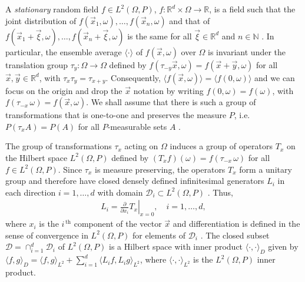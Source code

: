 \documentclass{cmslatex}
\begin{document}
A \emph{stationary} random field $f\in L^2(\Omega,P)$, 
$f:\mathbb{R}^d\times\Omega\to\mathbb{R}$, is a field such that the 
joint distribution of $f(\vec{x}_1,\omega),\ldots,f(\vec{x}_n,\omega)$ and that of
$f(\vec{x}_1+\vec{\xi},\omega),\ldots,f(\vec{x}_n+\vec{\xi},\omega)$ is the same for all
$\vec{\xi}\in\mathbb{R}^d$ and $n\in\mathbb{N}$
\cite{Golden:CMP-473,Papanicolaou:RF-835}. In particular, the ensemble
average $\langle\cdot\rangle$ of $f(\vec{x},\omega)$ over $\Omega$ is 
invariant under the translation group $\tau_y:\Omega\to\Omega$ defined by
$f(\tau_{-y}\vec{x},\omega)=f(\vec{x}+\vec{y},\omega)$ for all
$\vec{x},\vec{y}\in\mathbb{R}^d$, with $\tau_x\tau_y=\tau_{x+y}$. Consequently, 
$\langle f(\vec{x},\omega)\rangle=\langle f(0,\omega)\rangle$ and we can focus on the origin and drop the
$\vec{x}$ notation by writing $f(0,\omega)=f(\omega)$, with
$f(\tau_{-x}\,\omega)=f(\vec{x},\omega)$. We shall assume that there is such a group
of transformations that is one-to-one and preserves the measure $P$,
i.e. $P(\tau_xA)=P(A)$ for all $P$-measurable sets $A$
\cite{Golden:CMP-473,Papanicolaou:RF-835}.

The group of transformations $\tau_x$ acting on $\Omega$ induces a group of
operators $T_x$ on the Hilbert space $L^2(\Omega,P)$ defined by
$(T_xf)(\omega)=f(\tau_{-x}\,\omega)$ for all $f\in L^2(\Omega,P)$. Since $\tau_x$ is measure
preserving, the operators $T_x$ form a unitary group and therefore
have closed densely defined infinitesimal generators $L_i$ in each
direction $i=1,\ldots,d$ with domain $\mathscr{D}_i\subset L^2(\Omega,P)$
\cite{Golden:CMP-473,Papanicolaou:RF-835}. Thus,  
%
\begin{align}
  L_i=\left.\frac{\partial}{\partial x_i}T_x \right|_{x=0}, \quad i=1,\ldots,d,
\end{align}
%
where $x_i$
is the $i^{\,\text{th}}$ component of the vector
$\vec{x}$ and differentiation is defined in the sense of convergence
in $L^2(\Omega,P)$ for elements of $\mathscr{D}_i$
\cite{Golden:CMP-473}. The closed subset
$\mathscr{D}=\cap_{i=1}^d\mathscr{D}_i$ of $L^2(\Omega,P)$ is a Hilbert space
\cite{Golden:CMP-473} with inner product $\langle \cdot,\cdot\rangle_D$ given by  $\langle
f,g\rangle_D=\langle f,g\rangle_{L^2}+\sum_{i=1}^d\langle L_if,L_ig\rangle_{L^2}$, where $\langle\cdot,\cdot\rangle_{L^2}$
is the $L^2(\Omega,P)$ inner product. 
\end{document}

